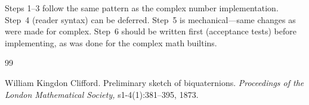 \documentclass[12pt]{report}
\begin{document}
\noindent Steps 1--3 follow the same pattern as the complex number
implementation.  Step~4 (reader syntax) can be deferred.
Step~5 is mechanical---same changes as were made for complex.
Step~6 should be written first (acceptance tests) before
implementing, as was done for the complex math builtins.

{
\frenchspacing
\begin{thebibliography}{99}

 William Kingdon Clifford.
  Preliminary sketch of biquaternions.
  {\it Proceedings of the London Mathematical Society,}
  s1-4(1):381--395, 1873.

\end{thebibliography}
}
\end{document}

